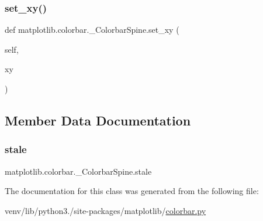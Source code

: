 \subsubsection{\texorpdfstring{set\+\_\+xy()}{set\_xy()}}
{\footnotesize\ttfamily def matplotlib.\+colorbar.\+\_\+\+Colorbar\+Spine.\+set\+\_\+xy (\begin{DoxyParamCaption}\item[{}]{self,  }\item[{}]{xy }\end{DoxyParamCaption})}



\subsection{Member Data Documentation}
\mbox{\label{classmatplotlib_1_1colorbar_1_1__ColorbarSpine_a9bc8a180a0fd2545e8230673fe1344d3}} 
\subsubsection{\texorpdfstring{stale}{stale}}
{\footnotesize\ttfamily matplotlib.\+colorbar.\+\_\+\+Colorbar\+Spine.\+stale}



The documentation for this class was generated from the following file\+:\begin{DoxyCompactItemize}
\item 
venv/lib/python3./site-\/packages/matplotlib/\hyperlink{colorbar_8py}{colorbar.\+py}\end{DoxyCompactItemize}

